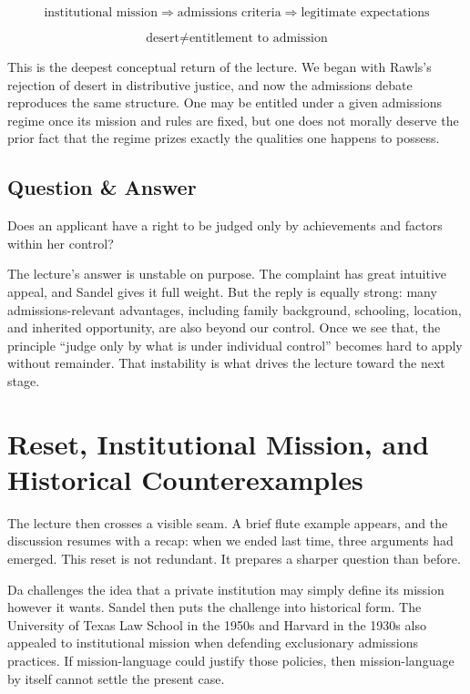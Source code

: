 \begin{equation}
\text{institutional mission}
\Longrightarrow
\text{admissions criteria}
\Longrightarrow
\text{legitimate expectations}
\end{equation}

\begin{equation}
\text{desert} \neq \text{entitlement to admission}
\end{equation}

This is the deepest conceptual return of the lecture. We began with Rawls's rejection of desert in distributive justice, and now the admissions debate reproduces the same structure. One may be entitled under a given admissions regime once its mission and rules are fixed, but one does not morally deserve the prior fact that the regime prizes exactly the qualities one happens to possess.

\subsection{Question \& Answer}

Does an applicant have a right to be judged only by achievements and factors within her control?

The lecture's answer is unstable on purpose. The complaint has great intuitive appeal, and Sandel gives it full weight. But the reply is equally strong: many admissions-relevant advantages, including family background, schooling, location, and inherited opportunity, are also beyond our control. Once we see that, the principle ``judge only by what is under individual control'' becomes hard to apply without remainder. That instability is what drives the lecture toward the next stage.

\section{Reset, Institutional Mission, and Historical Counterexamples}

The lecture then crosses a visible seam. A brief flute example appears, and the discussion resumes with a recap: when we ended last time, three arguments had emerged. This reset is not redundant. It prepares a sharper question than before.

Da challenges the idea that a private institution may simply define its mission however it wants. Sandel then puts the challenge into historical form. The University of Texas Law School in the 1950s and Harvard in the 1930s also appealed to institutional mission when defending exclusionary admissions practices. If mission-language could justify those policies, then mission-language by itself cannot settle the present case.

